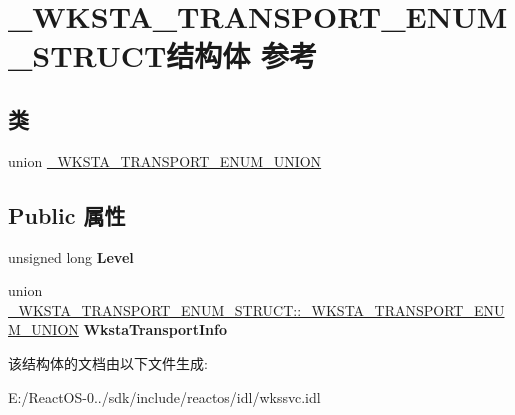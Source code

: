 \hypertarget{struct___w_k_s_t_a___t_r_a_n_s_p_o_r_t___e_n_u_m___s_t_r_u_c_t}{}\section{\+\_\+\+W\+K\+S\+T\+A\+\_\+\+T\+R\+A\+N\+S\+P\+O\+R\+T\+\_\+\+E\+N\+U\+M\+\_\+\+S\+T\+R\+U\+C\+T结构体 参考}
\label{struct___w_k_s_t_a___t_r_a_n_s_p_o_r_t___e_n_u_m___s_t_r_u_c_t}
\subsection*{类}
\begin{DoxyCompactItemize}
\item 
union \hyperlink{union___w_k_s_t_a___t_r_a_n_s_p_o_r_t___e_n_u_m___s_t_r_u_c_t_1_1___w_k_s_t_a___t_r_a_n_s_p_o_r_t___e_n_u_m___u_n_i_o_n}{\+\_\+\+W\+K\+S\+T\+A\+\_\+\+T\+R\+A\+N\+S\+P\+O\+R\+T\+\_\+\+E\+N\+U\+M\+\_\+\+U\+N\+I\+ON}
\end{DoxyCompactItemize}
\subsection*{Public 属性}
\begin{DoxyCompactItemize}
\item 
\mbox{\label{struct___w_k_s_t_a___t_r_a_n_s_p_o_r_t___e_n_u_m___s_t_r_u_c_t_a9272e5cd758349ae820dc1ee69aec45b}} 
unsigned long {\bfseries Level}
\item 
\mbox{\label{struct___w_k_s_t_a___t_r_a_n_s_p_o_r_t___e_n_u_m___s_t_r_u_c_t_a785604ae17f680838364c8875d5bf853}} 
union \hyperlink{union___w_k_s_t_a___t_r_a_n_s_p_o_r_t___e_n_u_m___s_t_r_u_c_t_1_1___w_k_s_t_a___t_r_a_n_s_p_o_r_t___e_n_u_m___u_n_i_o_n}{\+\_\+\+W\+K\+S\+T\+A\+\_\+\+T\+R\+A\+N\+S\+P\+O\+R\+T\+\_\+\+E\+N\+U\+M\+\_\+\+S\+T\+R\+U\+C\+T\+::\+\_\+\+W\+K\+S\+T\+A\+\_\+\+T\+R\+A\+N\+S\+P\+O\+R\+T\+\_\+\+E\+N\+U\+M\+\_\+\+U\+N\+I\+ON} {\bfseries Wksta\+Transport\+Info}
\end{DoxyCompactItemize}


该结构体的文档由以下文件生成\+:\begin{DoxyCompactItemize}
\item 
E\+:/\+React\+O\+S-\/0../sdk/include/reactos/idl/wkssvc.\+idl\end{DoxyCompactItemize}
